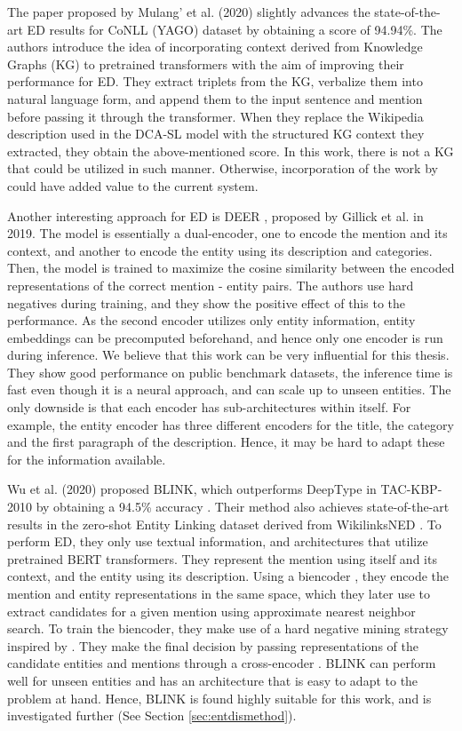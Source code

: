\documentclass{report}
\theoremstyle{definition}
\theoremstyle{remark}
\begin{document}
The paper proposed by Mulang' et al. (2020) \cite{mulang} slightly advances the state-of-the-art ED results for CoNLL (YAGO) dataset by obtaining a score of 94.94\%. The authors introduce the idea of incorporating context derived from Knowledge Graphs (KG) to pretrained transformers with the aim of improving their performance for ED. They extract triplets from the KG, verbalize them into natural language form, and append them to the input sentence and mention before passing it through the transformer. When they replace the Wikipedia description used in the DCA-SL model \cite{dca} with the structured KG context they extracted, they obtain the above-mentioned score. In this work, there is not a KG that could be utilized in such manner. Otherwise, incorporation of the work by \cite{mulang} could have added value to the current system.

Another interesting approach for ED is DEER \cite{googleintern},  proposed by Gillick et al. in 2019. The model is essentially a dual-encoder, one to encode the mention and its context, and another to encode the entity using its description and categories. Then, the model is trained to maximize the cosine similarity between the encoded representations of the correct mention - entity pairs. The authors use hard negatives during training, and they show the positive effect of this to the performance.  As the second encoder utilizes only entity information, entity embeddings can be precomputed beforehand, and hence only one encoder is run during inference. We believe that this work can be very influential for this thesis. They show good performance on public benchmark datasets, the inference time is fast even though it is a neural approach, and can scale up to unseen entities. The only downside is that each encoder has sub-architectures within itself. For example, the entity encoder has three different encoders for the title, the category and the first paragraph of the description. Hence, it may be hard to adapt these for the information available.

Wu et al. (2020) \cite{scalablezeroshot} proposed BLINK, which outperforms DeepType \cite{raiman} in TAC-KBP-2010 by obtaining a 94.5\% accuracy . Their method also achieves state-of-the-art results in the zero-shot Entity Linking dataset derived from WikilinksNED \cite{wikilinksned}. To perform ED, they only use textual information, and architectures that utilize pretrained BERT transformers. They represent the mention using itself and its context, and the entity using its description. Using a biencoder \cite{polyencoders}, they encode the mention and entity representations in the same space, which they later use to extract candidates for a given mention using approximate nearest neighbor search. To train the biencoder, they make use of a hard negative mining strategy inspired by \cite{googleintern}. They make the final decision by passing representations of the candidate entities and mentions through a cross-encoder \cite{polyencoders}. BLINK can perform well for unseen entities and has an architecture that is easy to adapt to the problem at hand. Hence, BLINK is found highly suitable for this work, and is investigated further (See Section \ref{sec:entdismethod}). 
\end{document}
